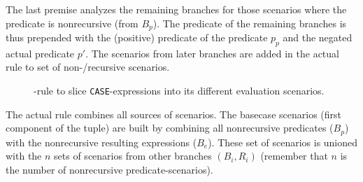 The last premise analyzes the remaining branches for those scenarios where the predicate is nonrecursive (from $B_p$). The predicate of the remaining branches is thus prepended with the (positive) predicate of the predicate $p_p$ and the negated actual predicate $p'$. The scenarios from later branches are added in the actual rule to set of non-/recursive scenarios.

\begin{figure}[h!]
    \centering\small

    \caption{\RWHEN-rule to slice \texttt{CASE}-expressions into its different evaluation scenarios.}
    \label{fig:my_label}
\end{figure}

The actual rule combines all sources of scenarios. The basecase scenarios (first component of the tuple) are built by combining all nonrecursive predicates ($B_p$) with the nonrecursive resulting expressions ($B_e$). These set of scenarios is unioned with the $n$ sets of scenarios from other branches $(B_i, R_i)$ (remember that $n$ is the number of nonrecursive predicate-scenarios).

